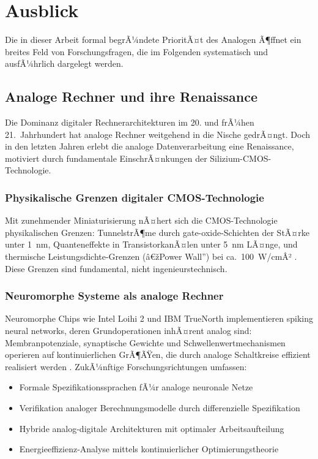 ﻿\documentclass[a4paper,12pt]{article}
\theoremstyle{definition}
\begin{document}
\section{Ausblick}
\label{sec:ausblick}

Die in dieser Arbeit formal begrÃ¼ndete PrioritÃ¤t des Analogen Ã¶ffnet ein breites
Feld von Forschungsfragen, die im Folgenden systematisch und ausfÃ¼hrlich dargelegt werden.

\subsection{Analoge Rechner und ihre Renaissance}

Die Dominanz digitaler Rechnerarchitekturen im 20. und frÃ¼hen 21.~Jahrhundert hat
analoge Rechner weitgehend in die Nische gedrÃ¤ngt.  Doch in den letzten Jahren
erlebt die analoge Datenverarbeitung eine Renaissance, motiviert durch fundamentale
EinschrÃ¤nkungen der Silizium-CMOS-Technologie.

\subsubsection{Physikalische Grenzen digitaler CMOS-Technologie}

Mit zunehmender Miniaturisierung nÃ¤hert sich die CMOS-Technologie physikalischen
Grenzen: TunnelstrÃ¶me durch gate-oxide-Schichten der StÃ¤rke unter 1~nm,
Quanteneffekte in TransistorkanÃ¤len unter 5~nm LÃ¤nge, und thermische Leistungsdichte-Grenzen
(â€žPower Wall'') bei ca.~100~W/cmÂ² \citep{Taur1998}.  Diese Grenzen sind fundamental,
nicht ingenieurstechnisch.

\subsubsection{Neuromorphe Systeme als analoge Rechner}

Neuromorphe Chips wie Intel Loihi 2 und IBM TrueNorth implementieren
spiking neural networks, deren Grundoperationen inhÃ¤rent analog sind:
Membranpotenziale, synaptische Gewichte und Schwellenwertmechanismen
operieren auf kontinuierlichen GrÃ¶ÃŸen, die durch analoge Schaltkreise
effizient realisiert werden \citep{Davies2021}.
ZukÃ¼nftige Forschungsrichtungen umfassen:
\begin{itemize}
    \item Formale Spezifikationssprachen fÃ¼r analoge neuronale Netze
    \item Verifikation analoger Berechnungsmodelle durch differenzielle Spezifikation
    \item Hybride analog-digitale Architekturen mit optimaler Arbeitsaufteilung
    \item Energieeffizienz-Analyse mittels kontinuierlicher Optimierungstheorie
\end{itemize}
\end{document}
